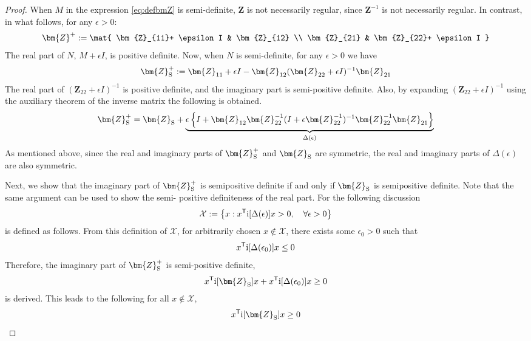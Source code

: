 \documentclass[graybox, envcountchap]{svmult}
\begin{document}
\begin{proof}
When $M$ in the expression \ref{eq:defbmZ} is semi-definite, $\bm{Z}$ is not necessarily regular, since $\bm{Z}^{-1}$ is not necessarily regular.
In contrast, in what follows, for any $\epsilon >0$:
\begin{align*}
\bm{Z}^{+}
:=
\mat{
\bm{Z}_{11}+ \epsilon I & \bm{Z}_{12} \\
\bm{Z}_{21} & \bm{Z}_{22}+ \epsilon I
}
\end{align*}
The real part of $N$, $M+\epsilon I$, is positive definite.
Now, when $N$ is semi-definite, for any $\epsilon >0$ we have
\begin{align*}
\bm{Z}_{\rm S}^{+}:=\bm{Z}_{11} + \epsilon I - \bm{Z}_{12} (\bm{Z}_{22}+ \epsilon I)^{-1}\bm{Z}_{21}
\end{align*}
The real part of $(\bm{Z}_{22}+ \epsilon I)^{-1}$ is positive definite, and the imaginary part is semi-positive definite.
Also, by expanding $(\bm{Z}_{22}+ \epsilon I)^{-1}$ using the auxiliary theorem of the inverse matrix the following is obtained.
\begin{align*}
\bm{Z}_{\rm S}^{+}=
\bm{Z}_{\rm S}
+ \underbrace{
\epsilon
\left\{
I + \bm{Z}_{12} \bm{Z}_{22}^{-1}
(I +\epsilon \bm{Z}_{22}^{-1} )^{-1}
\bm{Z}_{22}^{-1}\bm{Z}_{21}
\right\}
}_{\Delta(\epsilon)}
\end{align*}
As mentioned above, since the real and imaginary parts of $\bm{Z}_{\rm S}^{+}$ and $\bm{Z}_{\rm S}$ are symmetric,
the real and imaginary parts of $\Delta(\epsilon)$ are also symmetric.

Next, we show that the imaginary part of $\bm{Z}_{\rm S}^{+}$ is semipositive definite if and only if $\bm{Z}_{\rm S}$ is semipositive definite.
Note that the same argument can be used to show the semi- positive definiteness of the real part.
For the following discussion
\begin{align*}
\mathcal{X} := \left\{
x: 
x^{\sf T} {\rm i}[\Delta (\epsilon)] x >0
,\quad 
\forall \epsilon >0
\right\}
\end{align*}
is defined as follows.
From this definition of $\mathcal{X}$, for arbitrarily chosen $x \notin \mathcal{X}$, there exists some $\epsilon_0 >0$ such that
\[
x^{\sf T} {\rm i}[\Delta(\epsilon_0)]x \leq 0
\]
Therefore, the imaginary part of $ \bm{Z}_{\rm S}^{+} $ is semi-positive definite, 
\begin{align*}
x^{\sf T} \imag [\bm{Z}_{\rm S}] x + x^{\sf T} \imag[\Delta(\epsilon_0)]x \geq 0
\end{align*}
is derived.
This leads to the following for all $x \notin \mathcal{X}$, 
\begin{equation}\label{eq:xZxgeq}
x^{\sf T}\imag[\bm{Z}_{\rm S}] x \geq 0
\end{equation}


\end{proof}
\end{document}
